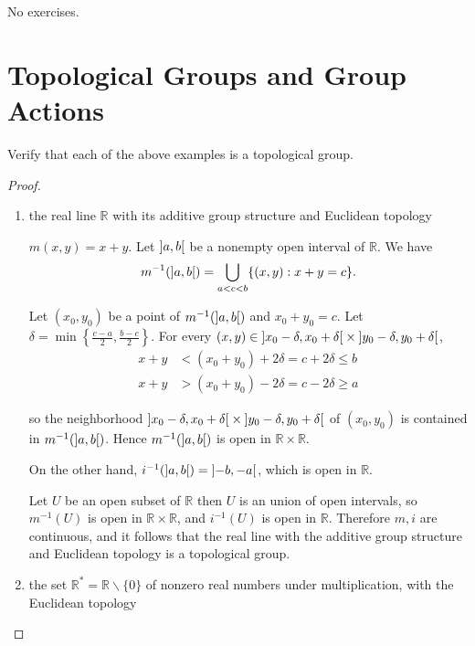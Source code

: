 No exercises.

\section*{Topological Groups and Group Actions}

\begin{exercise}{3.83}
	Verify that each of the above examples is a topological group.
\end{exercise}

\begin{proof}
	\begin{enumerate}[label={(\alph*)}]
		\item the real line $\mathbb{R}$ with its additive group structure and Euclidean topology

		      $m(x, y) = x + y$. Let $\left]{a, b}\right[$ be a nonempty open interval of $\mathbb{R}$. We have
		      \[
			      m^{-1}(\left]{a,b}\right[) = \bigcup_{a < c < b}\{ (x, y): x + y = c \}.
		      \]

		      Let $(x_{0}, y_{0})$ be a point of $m^{-1}(\left]{a,b}\right[)$ and $x_{0} + y_{0} = c$. Let $\delta = \min\left\{ \frac{c-a}{2}, \frac{b-c}{2} \right\}$. For every $(x, y)\in \left]{x_{0} - \delta, x_{0} + \delta}\right[\times\left]{y_{0} - \delta, y_{0} + \delta}\right[$,
		      \begin{align*}
			      x + y & < (x_{0} + y_{0}) + 2\delta = c + 2\delta \leq b \\
			      x + y & > (x_{0} + y_{0}) - 2\delta = c - 2\delta \geq a
		      \end{align*}

		      so the neighborhood $\left]{x_{0} - \delta, x_{0} + \delta}\right[\times\left]{y_{0} - \delta, y_{0} + \delta}\right[$ of $(x_{0}, y_{0})$ is contained in $m^{-1}(\left]{a, b}\right[)$. Hence $m^{-1}(\left]{a, b}\right[)$ is open in $\mathbb{R}\times\mathbb{R}$.

		      On the other hand, $i^{-1}(\left]{a, b}\right[) = \left]{-b, -a}\right[$, which is open in $\mathbb{R}$.

		      Let $U$ be an open subset of $\mathbb{R}$ then $U$ is an union of open intervals, so $m^{-1}(U)$ is open in $\mathbb{R}\times\mathbb{R}$, and $i^{-1}(U)$ is open in $\mathbb{R}$. Therefore $m, i$ are continuous, and it follows that the real line with the additive group structure and Euclidean topology is a topological group.
		\item the set $\mathbb{R}^{*} = \mathbb{R}\smallsetminus\{0\}$ of nonzero real numbers under multiplication, with the Euclidean topology


\end{enumerate}
\end{proof}
